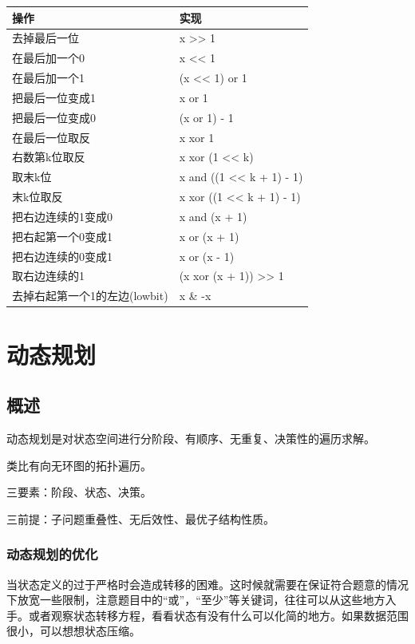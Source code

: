 \documentclass[11pt]{article}
\begin{document}
\begin{center}
\begin{tabular}{ll}
操作 & 实现\\
\hline
去掉最后一位 & x >> 1\\
在最后加一个0 & x << 1\\
在最后加一个1 & (x << 1) or 1\\
把最后一位变成1 & x or 1\\
把最后一位变成0 & (x or 1) - 1\\
在最后一位取反 & x xor 1\\
右数第k位取反 & x xor (1 << k)\\
取末k位 & x and ((1 << k + 1) - 1)\\
末k位取反 & x xor ((1 << k + 1) - 1)\\
把右边连续的1变成0 & x and (x + 1)\\
把右起第一个0变成1 & x or (x + 1)\\
把右边连续的0变成1 & x or (x - 1)\\
取右边连续的1 & (x xor (x + 1)) >> 1\\
去掉右起第一个1的左边(lowbit) & x \& -x\\
\end{tabular}
\end{center}

\section{动态规划}
\label{sec-5}
\subsection{概述}
\label{sec-5-1}

动态规划是对状态空间进行分阶段、有顺序、无重复、决策性的遍历求解。

类比有向无环图的拓扑遍历。

三要素：阶段、状态、决策。

三前提：子问题重叠性、无后效性、最优子结构性质。

\subsubsection{动态规划的优化}
\label{sec-5-1-1}

当状态定义的过于严格时会造成转移的困难。这时候就需要在保证符合题意的情况下放宽一些限制，注意题目中的“或”，“至少”等关键词，往往可以从这些地方入手。或者观察状态转移方程，看看状态有没有什么可以化简的地方。如果数据范围很小，可以想想状态压缩。
\end{document}
